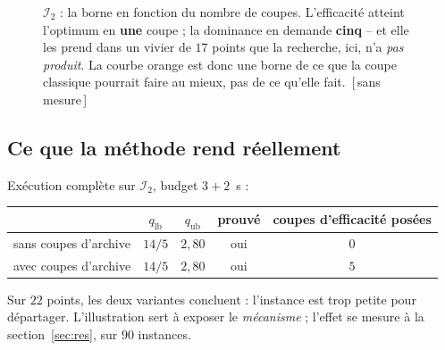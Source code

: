 \documentclass[11pt,a4paper]{article}
\theoremstyle{plain}
\theoremstyle{remark}
\newcommand{\qs}{q^{\star}}
\newcommand{\confna}{\textsf{\footnotesize[\,sans mesure\,]}}
\begin{document}
\begin{figure}[H]
\centering
{}
\caption{$\mathcal{I}_2$ : la borne en fonction du nombre de coupes.
L'\textcolor{ceff}{efficacité} atteint l'optimum en \textbf{une} coupe ; la
\textcolor{cdom}{dominance} en demande \textbf{cinq} -- et elle les prend
dans un vivier de $17$ points que la recherche, ici, n'a \emph{pas produit}.
La courbe orange est donc une borne de ce que la coupe classique pourrait
faire au mieux, pas de ce qu'elle fait.\ \confna}
\label{fig:i2traj}
\end{figure}

\subsection{Ce que la méthode rend réellement}

Exécution complète sur $\mathcal{I}_2$, budget $3+2$~s :
\begin{center}
\begin{tabular}{lcccc}
\toprule
& $q_{\text{lb}}$ & $q_{\text{ub}}$ & prouvé & coupes d'efficacité posées\\
\midrule
sans coupes d'archive & $14/5$ & $2{,}80$ & oui & $0$\\
avec coupes d'archive & $14/5$ & $2{,}80$ & oui & $5$\\
\bottomrule
\end{tabular}
\end{center}
\noindent
Sur $22$ points, les deux variantes concluent : l'instance est trop petite
pour départager. L'illustration sert à exposer le \emph{mécanisme} ; l'effet
se mesure à la section~\ref{sec:res}, sur $90$ instances.
\end{document}
